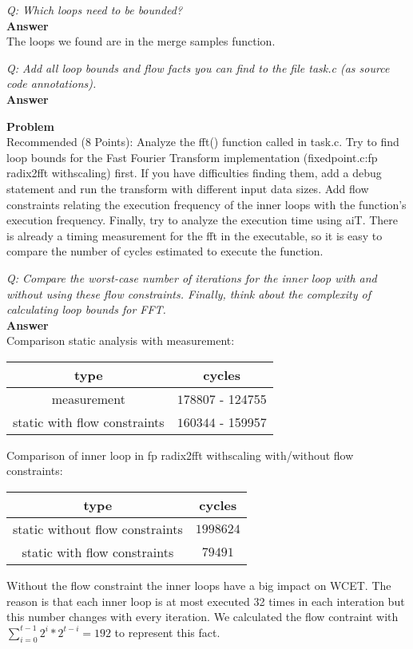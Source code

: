 \documentclass[a4paper,english,12pt,oneside]{article}
\newcounter{problemcounter}
\newcommand{\Prob}[1]{
\stepcounter{problemcounter}
\noindent\textbf{Problem \arabic{problemcounter}}\\
#1}
\newcommand{\Quest}[2]{
\noindent\emph{Q: #1}\\[0.5cm]
\noindent\textbf{Answer}\\
\noindent #2
\vspace{0.7cm}
}
\begin{document}
\Quest{Which loops need to be bounded?}
{
The loops we found are in the merge samples function.
}

\Quest{Add all loop bounds and flow facts you can find to the file task.c (as source code annotations).}
{

}




\Prob{Recommended (8 Points): Analyze the fft() function called in task.c. Try to find loop bounds for the Fast Fourier Transform implementation (fixedpoint.c:fp radix2fft withscaling) first. If you have difficulties finding them, add a debug statement and run the transform with different input data sizes. Add flow constraints relating the execution frequency of the inner loops with the function’s execution frequency. Finally, try to analyze the execution time using aiT. There is already a timing measurement for the fft in the executable, so it is easy to compare the number of cycles estimated to execute the function.}

\Quest{Compare the worst-case number of iterations for the inner loop with and without using these flow constraints. Finally, think about the complexity of calculating loop bounds for FFT.}
{
Comparison static analysis with measurement:

\begin{tabular}{|c|c|}
\hline
 type & cycles \\ \hline
 measurement & $178807$ - 124755 \\ \hline
 static with flow constraints & $160344$ - 159957\\ \hline
\end{tabular}

Comparison of inner loop in fp radix2fft withscaling with/without flow constraints:

\begin{tabular}{|c|c|}
    \hline
 type & cycles \\ \hline
 static without flow constraints & $1998624$ \\ \hline
 static with flow constraints & $79491$\\ \hline
\end{tabular}

Without the flow constraint the inner loops have a big impact on WCET. The reason is that each inner loop is at most executed 32 times in each interation but this number changes with every iteration. We calculated the flow contraint with  $\sum_{i=0}^{t-1} 2^i*2^{t-i}=192$ to represent this fact.
}
\end{document}
